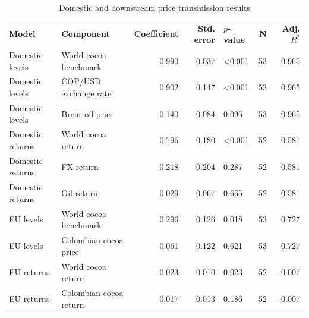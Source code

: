 \begin{table}
\caption{Domestic and downstream price transmission results}
\label{tab:transmission_results}
\begin{tabular}{llrrlrr}
\toprule
Model & Component & Coefficient & Std. error & $p$-value & N & Adj. $R^2$ \\
\midrule
Domestic levels & World cocoa benchmark & 0.990 & 0.037 & <0.001 & 53 & 0.965 \\
Domestic levels & COP/USD exchange rate & 0.902 & 0.147 & <0.001 & 53 & 0.965 \\
Domestic levels & Brent oil price & 0.140 & 0.084 & 0.096 & 53 & 0.965 \\
Domestic returns & World cocoa return & 0.796 & 0.180 & <0.001 & 52 & 0.581 \\
Domestic returns & FX return & 0.218 & 0.204 & 0.287 & 52 & 0.581 \\
Domestic returns & Oil return & 0.029 & 0.067 & 0.665 & 52 & 0.581 \\
EU levels & World cocoa benchmark & 0.296 & 0.126 & 0.018 & 53 & 0.727 \\
EU levels & Colombian cocoa price & -0.061 & 0.122 & 0.621 & 53 & 0.727 \\
EU returns & World cocoa return & -0.023 & 0.010 & 0.023 & 52 & -0.007 \\
EU returns & Colombian cocoa return & 0.017 & 0.013 & 0.186 & 52 & -0.007 \\
\bottomrule
\end{tabular}
\end{table}
